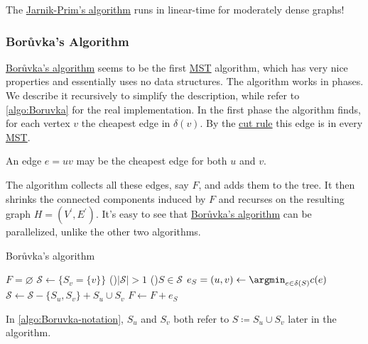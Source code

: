 \begin{remark}
	The \hyperref[algo:Jarnik-Prim]{Jarnik-Prim's algorithm} runs in linear-time for moderately dense graphs!
\end{remark}

\subsubsection{Borůvka's Algorithm}
\hyperref[algo:Boruvka]{Borůvka's algorithm} seems to be the first \hyperref[prb:MST]{MST} algorithm, which has very nice properties and essentially uses no data structures. The algorithm works in phases. We describe it recursively to simplify the description, while refer to \autoref{algo:Boruvka} for the real implementation. In the first phase the algorithm finds, for each vertex \(v\) the cheapest edge in \(\delta (v)\). By the \hyperref[lma:cut-rule]{cut rule} this edge is in every \hyperref[prb:MST]{MST}.

\begin{note}
	An edge \(e = uv\) may be the cheapest edge for both \(u\) and \(v\).
\end{note}

The algorithm collects all these edges, say \(F\), and adds them to the tree. It then shrinks the connected components induced by \(F\) and recurses on the resulting graph \(H = (V^{\prime}  , E^{\prime} )\). It's easy to see that \hyperref[algo:Boruvka]{Borůvka's algorithm} can be parallelized, unlike the other two algorithms.

\begin{algorithm}[H]\label{algo:Boruvka}
	\DontPrintSemicolon{}
	\caption{Borůvka's algorithm}
	\BlankLine

	\(F = \varnothing \)
	\(\mathcal{S} \gets \{ S_v = \{ v \} \} \)
	\While(){\(\lvert \mathcal{S} \rvert > 1\)}{
		\For(){\(S \in \mathcal{S} \)}{
			\(e_S = (u, v) \gets \argmin_{e \in \delta (S)} c(e)\)\;
			\(\mathcal{S} \gets \mathcal{S} - \{ S_u, S_v \} + S_u \cup S_v\)\label{algo:Boruvka-notation}
			\(F \gets F + e_S\)
		}
	}
	\;
\end{algorithm}

\begin{notation}
	In \autoref{algo:Boruvka-notation}, \(S_u\) and \(S_v\) both refer to \(S \coloneqq S_u \cup S_v\) later in the algorithm.
\end{notation}

